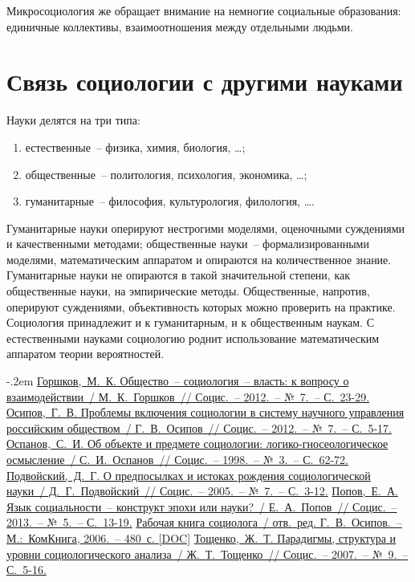   Микросоциология же обращает внимание на немногие социальные образования:
  единичные коллективы, взаимоотношения между отдельными людьми.

\section{Связь социологии с другими науками}

  Науки делятся на три типа:
  \begin{enumerate}
    \item естественные~-- физика, химия, биология, \ldots;
    \item общественные~-- политология, психология, экономика, \ldots;
    \item гуманитарные~-- философия, культурология, филология, \ldots.
  \end{enumerate}

  Гуманитарные науки оперируют нестрогими моделями, оценочными суждениями и
  качественными методами; общественные науки~-- формализированными моделями,
  математическим аппаратом и опираются на количественное знание. Гуманитарные
  науки не опираются в такой значительной степени, как общественные науки, на
  эмпирические методы. Общественные, напротив, оперируют суждениями,
  объективность которых можно проверить на практике. Социология принадлежит и к
  гуманитарным, и к общественным наукам. С естественными науками социологию
  роднит использование математическим аппаратом теории вероятностей.

  \begin{thebibliography}{9}
    \itemsep -.2em
     \href{http://www.isras.ru/files/File/Socis/2012_7/Gorshkov.pdf}
      {Горшков,~М.~К. Общество~-- социология~-- власть: к вопросу о
      взаимодействии~/ М.~К.~Горшков~// Социс.~-- 2012.~-- №~7.~-- С.~23-29.}
     \href{http://www.isras.ru/files/File/Socis/2012_7/Osipov.pdf}
      {Осипов,~Г.~В. Проблемы включения социологии в систему научного управления
      российским обществом~/ Г.~В.~Осипов~// Социс.~-- 2012.~-- №~7.~--
      С.~5-17.}
     \href{http://ecsocman.hse.ru/data/580/722/1217/010.OSPANOV.pdf}
      {Оспанов,~С.~И. Об объекте и предмете социологии: логико-гносеологическое
      осмысление~/ С.~И.~Оспанов~// Социс.~-- 1998.~-- №~3.~-- С.~62-72.}
     \href{http://www.isras.ru/files/File/Socis/2005-7/podvoyski.pdf}
      {Подвойский,~Д.~Г. О предпосылках и истоках рождения социологической
      науки~/ Д.~Г.~Подвойский~// Социс.~-- 2005.~-- №~7.~-- С.~3-12.}
     \href{http://www.isras.ru/files/File/Socis/2013_5/Popov.pdf}
      {Попов,~Е.~А. Язык социальности~-- конструкт эпохи или науки?~/
      Е.~А.~Попов~// Социс.~-- 2013.~-- №~5.~-- С.~13-19.}
     \href{http://vk.cc/2ivPZk}{Рабочая книга социолога~/ отв.~ред.
      Г.~В.~Осипов.~-- М.:~КомКнига, 2006.~-- 480~с. [DOC]}
     \href{http://2008.isras.ru/files/File/Socis/2007-9/toschenko.pdf}
      {Тощенко,~Ж.~Т. Парадигмы, структура и уровни социологического
      анализа~/ Ж.~Т.~Тощенко~// Социс.~-- 2007.~-- №~9.~-- С.~5-16.}
  \end{thebibliography}
